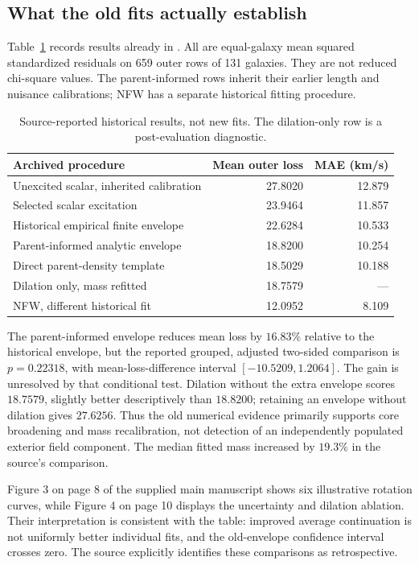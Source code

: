 \documentclass[11pt]{article}
\begin{document}
\subsection{What the old fits actually establish}
Table~\ref{ext:historical} records results already in \cite[Sections VIII and Methods, Tables 1--2]{cubicmain}. All are equal-galaxy mean squared standardized residuals on 659 outer rows of 131 galaxies. They are not reduced chi-square values. The parent-informed rows inherit their earlier length and nuisance calibrations; NFW has a separate historical fitting procedure.
\begin{table}[htbp]\centering
\begin{tabular}{p{.56\linewidth}rr}\toprule
Archived procedure & Mean outer loss & MAE (km/s)\\\midrule
Unexcited scalar, inherited calibration & 27.8020 & 12.879\\
Selected scalar excitation & 23.9464 & 11.857\\
Historical empirical finite envelope & 22.6284 & 10.533\\
Parent-informed analytic envelope & 18.8200 & 10.254\\
Direct parent-density template & 18.5029 & 10.188\\
Dilation only, mass refitted & 18.7579 & ---\\
NFW, different historical fit & 12.0952 & 8.109\\\bottomrule
\end{tabular}
\caption{Source-reported historical results, not new fits. The dilation-only row is a post-evaluation diagnostic.}\label{ext:historical}
\end{table}
The parent-informed envelope reduces mean loss by $16.83\%$ relative to the historical envelope, but the reported grouped, adjusted two-sided comparison is $p=0.22318$, with mean-loss-difference interval $[-10.5209,1.2064]$. The gain is unresolved by that conditional test. Dilation without the extra envelope scores $18.7579$, slightly better descriptively than $18.8200$; retaining an envelope without dilation gives $27.6256$. Thus the old numerical evidence primarily supports core broadening and mass recalibration, not detection of an independently populated exterior field component. The median fitted mass increased by $19.3\%$ in the source's comparison.

Figure 3 on page 8 of the supplied main manuscript shows six illustrative rotation curves, while Figure 4 on page 10 displays the uncertainty and dilation ablation. Their interpretation is consistent with the table: improved average continuation is not uniformly better individual fits, and the old-envelope confidence interval crosses zero. The source explicitly identifies these comparisons as retrospective.
\end{document}
